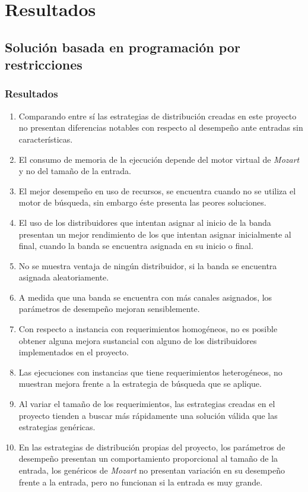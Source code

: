 \section{Resultados}

\subsection{Solución basada en programación por restricciones}

\subsubsection{Resultados}

\begin{enumerate}
	\item Comparando entre sí las estrategias de distribución creadas en este proyecto no presentan diferencias notables con respecto al desempeño ante entradas sin características.
	\item El consumo de memoria de la ejecución depende del motor virtual de \textit{Mozart} y no del tamaño de la entrada.
	\item El mejor desempeño en uso de recursos, se encuentra cuando no se utiliza el motor de búsqueda, sin embargo éste presenta las peores soluciones.
	\item El uso de los distribuidores que intentan asignar al inicio de la banda presentan un mejor rendimiento de los que intentan asignar inicialmente al final, cuando la banda se encuentra asignada en su inicio o final.
	\item No se muestra ventaja de ningún distribuidor, si la banda se encuentra asignada aleatoriamente.
	\item A medida que una banda se encuentra con más canales asignados, los parámetros de desempeño mejoran sensiblemente.
	\item Con respecto a instancia con requerimientos homogéneos, no es posible obtener alguna mejora sustancial con alguno de los distribuidores implementados en el proyecto.
	\item Las ejecuciones con instancias que tiene requerimientos heterogéneos, no muestran mejora frente a la estrategia de búsqueda que se aplique.
	\item Al variar el tamaño de los requerimientos, las estrategias creadas en el proyecto tienden a buscar más rápidamente una solución válida que las estrategias genéricas.
	\item En las estrategias de distribución propias del proyecto, los parámetros de desempeño presentan un comportamiento proporcional al tamaño de la entrada, los genéricos de \textit{Mozart} no presentan variación en su desempeño frente a la entrada, pero no funcionan si la entrada es muy grande.

\end{enumerate}
